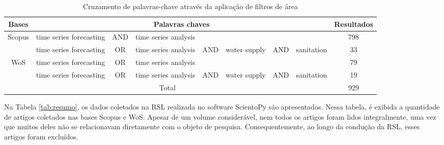\begin{table}[H]
	\centering
	\caption{Cruzamento de palavras-chave através da aplicação de filtros de área}\label{tb1}
	\begin{tabular}{@{}cp{2cm}cp{2cm}cp{1.5cm}cp{2cm}c@{}}
			\toprule
			Bases                   & \multicolumn{7}{c}{Palavras chaves}                                                          & Resultados \\ \midrule
			\multirow{2}{*}{Scopus} & time series forecasting & AND & time series analysis &     &              &     &            & 798        \\
			& time series forecasting & OR  & time series analysis & AND & water supply & AND & sanitation & 33         \\
			\multirow{2}{*}{WoS}    & time series forecasting & OR  & time series analysis &     &              &     &            & 79         \\
			& time series forecasting & OR  & time series analysis & AND & water supply & AND & sanitation & 19         \\ \hline
			\multicolumn{8}{c}{Total}                                                                                              & 929        \\ \bottomrule
		\end{tabular}
	
\end{table}



Na Tabela \ref{tab:resumo}, os dados coletados na RSL realizada no software ScientoPy  são apresentados. Nessa tabela, é exibida a quantidade de artigos coletados nas bases Scopus e WoS. Apesar de um volume considerável, nem todos os artigos foram lidos integralmente, uma vez que muitos deles não se relacionavam diretamente com o objeto de pesquisa. Consequentemente, ao longo da condução da RSL, esses artigos foram excluídos.

